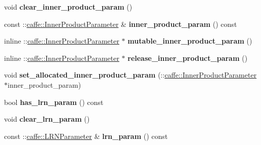 \begin{DoxyCompactItemize}
\mbox{\label{classcaffe_1_1_v1_layer_parameter_abf89b78d25e3804d89f4fee1c3cc8b28}} 
void {\bfseries clear\+\_\+inner\+\_\+product\+\_\+param} ()
\item 
\mbox{\label{classcaffe_1_1_v1_layer_parameter_a9437f22edb62b3c7af08b5e827b26661}} 
const \+::\mbox{\hyperlink{classcaffe_1_1_inner_product_parameter}{caffe\+::\+Inner\+Product\+Parameter}} \& {\bfseries inner\+\_\+product\+\_\+param} () const
\item 
\mbox{\label{classcaffe_1_1_v1_layer_parameter_a767582da0eeda2b60698ac6d62f68088}} 
inline \+::\mbox{\hyperlink{classcaffe_1_1_inner_product_parameter}{caffe\+::\+Inner\+Product\+Parameter}} $\ast$ {\bfseries mutable\+\_\+inner\+\_\+product\+\_\+param} ()
\item 
\mbox{\label{classcaffe_1_1_v1_layer_parameter_a5d1de24472ee4d53395782b5f04846e2}} 
inline \+::\mbox{\hyperlink{classcaffe_1_1_inner_product_parameter}{caffe\+::\+Inner\+Product\+Parameter}} $\ast$ {\bfseries release\+\_\+inner\+\_\+product\+\_\+param} ()
\item 
\mbox{\label{classcaffe_1_1_v1_layer_parameter_ac0701e052c33512b9f791a1fada839aa}} 
void {\bfseries set\+\_\+allocated\+\_\+inner\+\_\+product\+\_\+param} (\+::\mbox{\hyperlink{classcaffe_1_1_inner_product_parameter}{caffe\+::\+Inner\+Product\+Parameter}} $\ast$inner\+\_\+product\+\_\+param)
\item 
\mbox{\label{classcaffe_1_1_v1_layer_parameter_a40a8916bff16c864d376e87cde0b459b}} 
bool {\bfseries has\+\_\+lrn\+\_\+param} () const
\item 
\mbox{\label{classcaffe_1_1_v1_layer_parameter_a5053760676afa2bd3053c35730d5e420}} 
void {\bfseries clear\+\_\+lrn\+\_\+param} ()
\item 
\mbox{\label{classcaffe_1_1_v1_layer_parameter_ad387141d36a78e4ee9f7c663790e05e9}} 
const \+::\mbox{\hyperlink{classcaffe_1_1_l_r_n_parameter}{caffe\+::\+L\+R\+N\+Parameter}} \& {\bfseries lrn\+\_\+param} () const

\end{DoxyCompactItemize}
